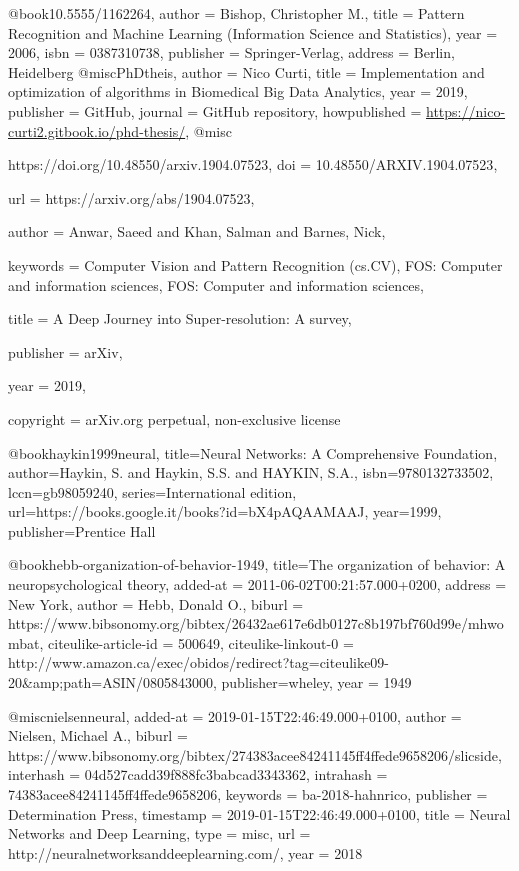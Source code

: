 @book{10.5555/1162264,
author = {Bishop, Christopher M.},
title = {Pattern Recognition and Machine Learning (Information Science and Statistics)},
year = {2006},
isbn = {0387310738},
publisher = {Springer-Verlag},
address = {Berlin, Heidelberg}
}
@misc{PhDtheis,
  author = {Nico Curti},
  title = {Implementation and optimization of algorithms in Biomedical Big Data Analytics},
  year = {2019},
  publisher = {GitHub},
  journal = {GitHub repository},
  howpublished = {\url{https://nico-curti2.gitbook.io/phd-thesis/}},
}
@misc{https://doi.org/10.48550/arxiv.1904.07523,
  doi = {10.48550/ARXIV.1904.07523},
  
  url = {https://arxiv.org/abs/1904.07523},
  
  author = {Anwar, Saeed and Khan, Salman and Barnes, Nick},
  
  keywords = {Computer Vision and Pattern Recognition (cs.CV), FOS: Computer and information sciences, FOS: Computer and information sciences},
  
  title = {A Deep Journey into Super-resolution: A survey},
  
  publisher = {arXiv},
  
  year = {2019},
  
  copyright = {arXiv.org perpetual, non-exclusive license}
}
@book{haykin1999neural,
  title={Neural Networks: A Comprehensive Foundation},
  author={Haykin, S. and Haykin, S.S. and HAYKIN, S.A.},
  isbn={9780132733502},
  lccn={gb98059240},
  series={International edition},
  url={https://books.google.it/books?id=bX4pAQAAMAAJ},
  year={1999},
  publisher={Prentice Hall}
}

@book{hebb-organization-of-behavior-1949,
 title={The organization of behavior: A neuropsychological theory},
  added-at = {2011-06-02T00:21:57.000+0200},
  address = {New York},
  author = {Hebb, Donald O.},
  biburl = {https://www.bibsonomy.org/bibtex/26432ae617e6db0127c8b197bf760d99e/mhwombat},
  citeulike-article-id = {500649},
  citeulike-linkout-0 = {http://www.amazon.ca/exec/obidos/redirect?tag=citeulike09-20\&amp;path=ASIN/0805843000},
  publisher={wheley},
  year = {1949}
}

@misc{nielsenneural,
  added-at = {2019-01-15T22:46:49.000+0100},
  author = {Nielsen, Michael A.},
  biburl = {https://www.bibsonomy.org/bibtex/274383acee84241145ff4ffede9658206/slicside},
  interhash = {04d527cadd39f888fc3babcad3343362},
  intrahash = {74383acee84241145ff4ffede9658206},
  keywords = {ba-2018-hahnrico},
  publisher = {Determination Press},
  timestamp = {2019-01-15T22:46:49.000+0100},
  title = {Neural Networks and Deep Learning},
  type = {misc},
  url = {http://neuralnetworksanddeeplearning.com/},
  year = 2018
}

